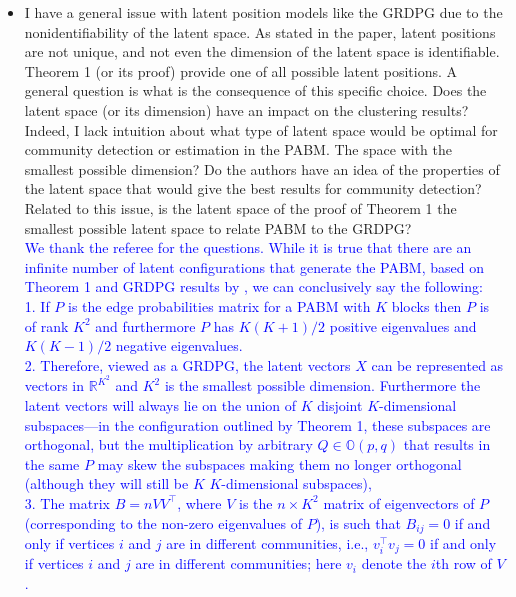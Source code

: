 \documentclass[
]{article}
\begin{document}
\begin{itemize}
\item
  I have a general issue with latent position models like the GRDPG due
  to the nonidentifiability of the latent space. As stated in the paper,
  latent positions are not unique, and not even the dimension of the
  latent space is identifiable. Theorem 1 (or its proof) provide one of
  all possible latent positions. A general question is what is the
  consequence of this specific choice. Does the latent space (or its
  dimension) have an impact on the clustering results? Indeed, I lack
  intuition about what type of latent space would be optimal for
  community detection or estimation in the PABM. The space with the
  smallest possible dimension? Do the authors have an idea of the
  properties of the latent space that would give the best results for
  community detection? Related to this issue, is the latent space of the
  proof of Theorem 1 the smallest possible latent space to relate PABM
  to the GRDPG?\\
  \textcolor{blue}{
  We thank the referee for the questions. 
  While it is true that there are an infinite number of latent configurations that generate the PABM, based on Theorem 1 and GRDPG results by \citet{rubindelanchy2017statistical}, we can conclusively say the following: 
  \\1. If $P$ is the edge probabilities matrix for a PABM with $K$
  blocks then $P$ is of rank $K^2$ and furthermore $P$ has $K (K + 1) /
  2$ positive eigenvalues and $K (K - 1) / 2$ negative eigenvalues. 
  \\2. Therefore, viewed as a GRDPG, the latent vectors $X$ can be
  represented as vectors in $\mathbb{R}^{K^2}$ and 
  $K^2$ is the smallest possible dimension. Furthermore the latent
  vectors will always lie on the union of $K$ disjoint $K$-dimensional subspaces---in the configuration outlined by Theorem 1, these subspaces are orthogonal, but the multiplication by arbitrary $Q \in \mathbb{O}(p, q)$ that results in the same $P$ may skew the subspaces making them no longer orthogonal (although they will still be $K$ $K$-dimensional subspaces), 
  \\3. The matrix $B = n V V^\top$, where $V$ is the $n \times K^2$
  matrix of eigenvectors of $P$ (corresponding to the non-zero
  eigenvalues of $P$), is such that $B_{ij} = 0$ if and only
  if vertices $i$ and $j$ are in different communities, i.e.,
  $v_i^{\top} v_j = 0$ if and only if vertices $i$ and $j$ are in
  different communities; here $v_i$ denote the $i$th row of $V$. 
}
\end{itemize}
\end{document}
